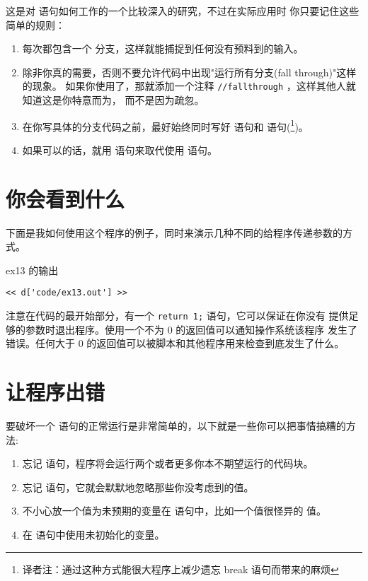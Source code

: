 这是对  语句如何工作的一个比较深入的研究，不过在实际应用时
你只要记住这些简单的规则：
\begin{enumerate}
\item 每次都包含一个  分支，这样就能捕捉到任何没有预料到的输入。
\item 除非你真的需要，否则不要允许代码中出现"运行所有分支(fall through)"这样的现象。
如果你使用了，那就添加一个注释 \verb|//fallthrough| ，这样其他人就知道这是你特意而为，
而不是因为疏忽。
\item 在你写具体的分支代码之前，最好始终同时写好  语句和  语句(\footnote{译者注：通过这种方式能很大程序上减少遗忘 break 语句而带来的麻烦})。
\item 如果可以的话，就用  语句来取代使用  语句。
\end{enumerate}

\section{你会看到什么}

下面是我如何使用这个程序的例子，同时来演示几种不同的给程序传递参数的方式。
\begin{code}{ex13 的输出}
\begin{lstlisting}
<< d['code/ex13.out'] >>
\end{lstlisting}
\end{code}

注意在代码的最开始部分，有一个 \verb|return 1;| 语句，它可以保证在你没有
提供足够的参数时退出程序。使用一个不为 0 的返回值可以通知操作系统该程序
发生了错误。任何大于 0 的返回值可以被脚本和其他程序用来检查到底发生了什么。

\section{让程序出错}

要破坏一个  语句的正常运行是非常简单的，以下就是一些你可以把事情搞糟的方法:
\begin{enumerate}
\item 忘记  语句，程序将会运行两个或者更多你本不期望运行的代码块。
\item 忘记  语句，它就会默默地忽略那些你没考虑到的值。
\item 不小心放一个值为未预期的变量在  语句中，比如一个值很怪异的  值。
\item 在  语句中使用未初始化的变量。
\end{enumerate}

